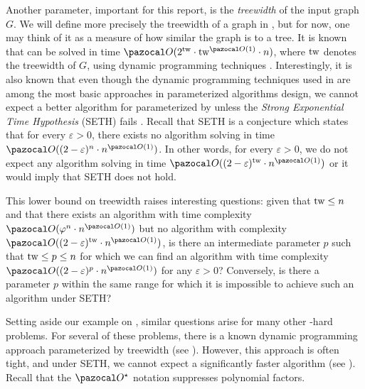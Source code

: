 \medskip

Another parameter, important for this report, is the \textit{treewidth} of the input graph $G$. We will define more precisely the treewidth of a graph in , but for now, one may think of it as a measure of how similar the graph is to a tree. It is known that  can be solved in time $\O(2^{\tw}\cdot\tw^{\O(1)}\cdot n)$, where $\text{tw}$ denotes the treewidth of $G$, using dynamic programming techniques \cite[Corollary~7.6]{cygan2015parameterized}. Interestingly, it is also known that even though the dynamic programming techniques used in \cite[Corollary~7.6]{cygan2015parameterized} are among the most basic approaches in parameterized algorithms design, we cannot expect a better algorithm for  parameterized by \tw{} unless the \textit{Strong Exponential Time Hypothesis} (SETH) fails \cite{lokshtanov2011known}. Recall that SETH is a conjecture which states that for every $\varepsilon > 0$, there exists no algorithm solving  in time $\O((2 - \varepsilon)^n\cdot n^{\O(1)})$. In other words, for every $\varepsilon > 0$, we do not expect any algorithm solving  in time $\O((2-\varepsilon)^\tw \cdot n^{\O(1)})$ or it would imply that SETH does not hold.

This lower bound on treewidth raises interesting questions: given that $\text{tw}{} \leq n$ and that there exists an algorithm with time complexity $\O(\varphi^n \cdot n^{\O(1)})$ but no algorithm with complexity $\O((2 - \varepsilon)^\tw  \cdot n^{\O(1)})$, is there an intermediate parameter $p$ such that $\text{tw} \leq p \leq n$ for which we can find an algorithm with time complexity $\O((2 - \varepsilon)^p \cdot n^{\O(1)})$ for any $\varepsilon > 0$?  Conversely, is there a parameter $p$ within the same range for which it is impossible to achieve such an algorithm under SETH?

\medskip

Setting aside our example on , similar questions arise for many other \NP-hard problems. For several of these problems, there is a known dynamic programming approach parameterized by treewidth (see ). However, this approach is often tight, and under SETH, we cannot expect a significantly faster algorithm (see ). Recall that the $\O^\star$ notation suppresses polynomial factors.

